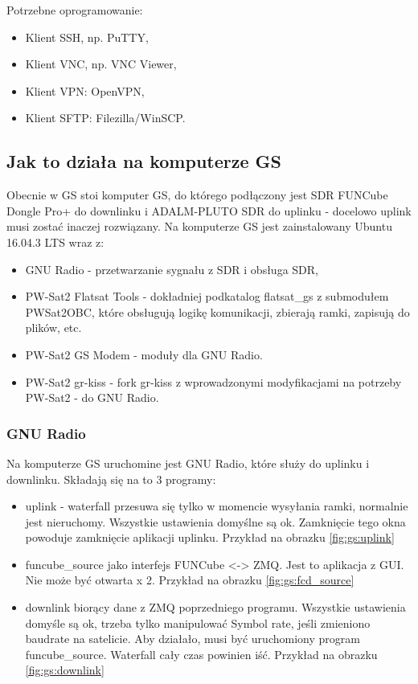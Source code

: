 Potrzebne oprogramowanie:
\begin{itemize}
	\item Klient SSH, np. PuTTY,
	\item Klient VNC, np. VNC Viewer,
	\item Klient VPN: OpenVPN,
	\item Klient SFTP: Filezilla/WinSCP.
\end{itemize}

\subsection{Jak to działa na komputerze GS}
Obecnie w GS stoi komputer GS, do którego podłączony jest SDR FUNCube Dongle Pro+ do downlinku i ADALM-PLUTO SDR do uplinku - docelowo uplink musi zostać inaczej rozwiązany. Na komputerze GS jest zainstalowany Ubuntu 16.04.3 LTS wraz z:

\begin{itemize}
	\item GNU Radio - przetwarzanie sygnału z SDR i obsługa SDR,
	\item PW-Sat2 Flatsat Tools - dokładniej podkatalog flatsat_gs z submodułem PWSat2OBC, które obsługują logikę komunikacji, zbierają ramki, zapisują do plików, etc.
	\item PW-Sat2 GS Modem - moduły dla GNU Radio.
	\item PW-Sat2 gr-kiss - fork gr-kiss z wprowadzonymi modyfikacjami na potrzeby PW-Sat2 - do GNU Radio.
\end{itemize}

\subsubsection{GNU Radio}
Na komputerze GS uruchomine jest GNU Radio, które służy do uplinku i downlinku. Składają się na to 3 programy:

\begin{itemize}
	\item uplink - waterfall przesuwa się tylko w momencie wysyłania ramki, normalnie jest nieruchomy. Wszystkie ustawienia domyślne są ok. Zamknięcie tego okna powoduje zamknięcie aplikacji uplinku. Przykład na obrazku \ref{fig:gs:uplink}
	\item funcube_source jako interfejs FUNCube <-> ZMQ. Jest to aplikacja z GUI. Nie może być otwarta x 2. Przykład na obrazku \ref{fig:gs:fcd_source}
	\item downlink biorący dane z ZMQ poprzedniego programu. Wszystkie ustawienia domyśle są ok, trzeba tylko manipulować Symbol rate, jeśli zmieniono baudrate na satelicie. Aby działało, musi być uruchomiony program funcube_source. Waterfall cały czas powinien iść. Przykład na obrazku \ref{fig:gs:downlink}
\end{itemize}

